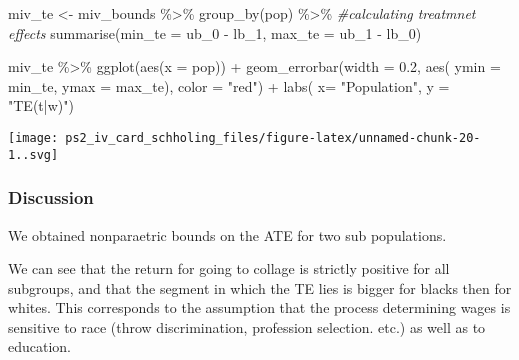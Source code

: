 \documentclass[
]{article}
\newenvironment{Shaded}{\begin{snugshade}}{\end{snugshade}}
\newcommand{\AttributeTok}[1]{\textcolor[rgb]{0.77,0.63,0.00}{#1}}
\newcommand{\CommentTok}[1]{\textcolor[rgb]{0.56,0.35,0.01}{\textit{#1}}}
\newcommand{\FloatTok}[1]{\textcolor[rgb]{0.00,0.00,0.81}{#1}}
\newcommand{\FunctionTok}[1]{\textcolor[rgb]{0.00,0.00,0.00}{#1}}
\newcommand{\NormalTok}[1]{#1}
\newcommand{\OtherTok}[1]{\textcolor[rgb]{0.56,0.35,0.01}{#1}}
\newcommand{\SpecialCharTok}[1]{\textcolor[rgb]{0.00,0.00,0.00}{#1}}
\newcommand{\StringTok}[1]{\textcolor[rgb]{0.31,0.60,0.02}{#1}}
\begin{document}
\begin{Shaded}
\begin{Highlighting}[]
\NormalTok{miv\_te  }\OtherTok{\textless{}{-}}\NormalTok{  miv\_bounds }\SpecialCharTok{\%\textgreater{}\%} \FunctionTok{group\_by}\NormalTok{(pop) }\SpecialCharTok{\%\textgreater{}\%}  \CommentTok{\#calculating treatmnet effects}
  \FunctionTok{summarise}\NormalTok{(}\AttributeTok{min\_te =}\NormalTok{ ub\_0 }\SpecialCharTok{{-}}\NormalTok{ lb\_1,}
            \AttributeTok{max\_te =}\NormalTok{ ub\_1 }\SpecialCharTok{{-}}\NormalTok{ lb\_0)}

\NormalTok{miv\_te }\SpecialCharTok{\%\textgreater{}\%} \FunctionTok{ggplot}\NormalTok{(}\FunctionTok{aes}\NormalTok{(}\AttributeTok{x =}\NormalTok{ pop)) }\SpecialCharTok{+}
  \FunctionTok{geom\_errorbar}\NormalTok{(}\AttributeTok{width =} \FloatTok{0.2}\NormalTok{, }\FunctionTok{aes}\NormalTok{(}
    \AttributeTok{ymin =}\NormalTok{ min\_te,}
    \AttributeTok{ymax =}\NormalTok{ max\_te),}
    \AttributeTok{color =} \StringTok{"red"}\NormalTok{) }\SpecialCharTok{+}
  \FunctionTok{labs}\NormalTok{( }\AttributeTok{x=} \StringTok{"Population"}\NormalTok{, }\AttributeTok{y =} \StringTok{"TE(t|w)"}\NormalTok{)}
\end{Highlighting}
\end{Shaded}

\texttt{[image: ps2\_iv\_card\_schholing\_files/figure-latex/unnamed-chunk-20-1..svg]}

\hypertarget{discussion-1}{%
\subsubsection{Discussion}\label{discussion-1}}

We obtained nonparaetric bounds on the ATE for two sub populations.

We can see that the return for going to collage is strictly positive for
all subgroups, and that the segment in which the TE lies is bigger for
blacks then for whites. This corresponds to the assumption that the
process determining wages is sensitive to race (throw discrimination,
profession selection. etc.) as well as to education.
\end{document}
